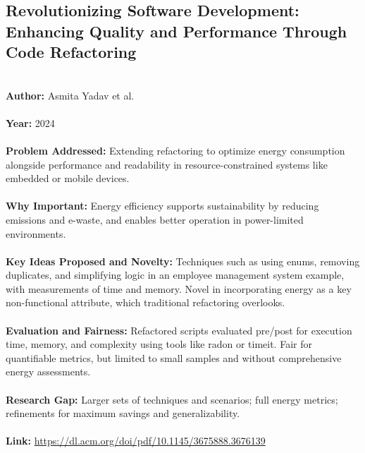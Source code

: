 \documentclass[12pt]{article}
\begin{document}
\subsection*{Revolutionizing Software Development: Enhancing Quality and Performance Through Code Refactoring}
\\
\textbf{Author:} Asmita Yadav et al. \\
\\
\textbf{Year:} 2024 \\
\\
\textbf{Problem Addressed:} Extending refactoring to optimize energy consumption alongside performance and readability in resource-constrained systems like embedded or mobile devices. \\
\\
\textbf{Why Important:} Energy efficiency supports sustainability by reducing emissions and e-waste, and enables better operation in power-limited environments. \\
\\
\textbf{Key Ideas Proposed and Novelty:} Techniques such as using enums, removing duplicates, and simplifying logic in an employee management system example, with measurements of time and memory. Novel in incorporating energy as a key non-functional attribute, which traditional refactoring overlooks. \\
\\
\textbf{Evaluation and Fairness:} Refactored scripts evaluated pre/post for execution time, memory, and complexity using tools like radon or timeit. Fair for quantifiable metrics, but limited to small samples and without comprehensive energy assessments. \\
\\
\textbf{Research Gap:} Larger sets of techniques and scenarios; full energy metrics; refinements for maximum savings and generalizability. \\
\\
\textbf{Link:} \url{https://dl.acm.org/doi/pdf/10.1145/3675888.3676139}
\pagebreak

\end{document}
